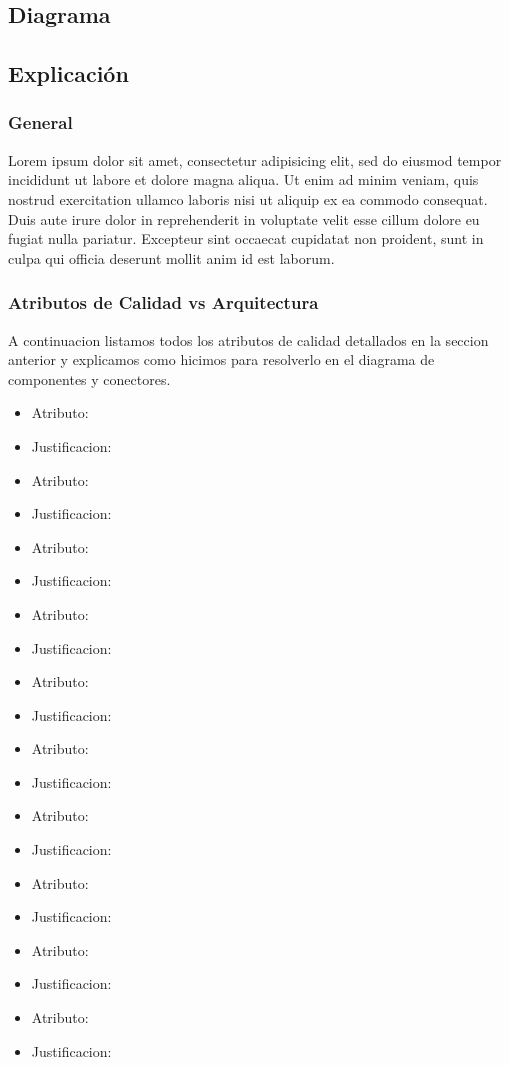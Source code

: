\subsection{Diagrama}
\subsection{Explicación}
\subsubsection{General}
Lorem ipsum dolor sit amet, consectetur adipisicing elit, sed do eiusmod
tempor incididunt ut labore et dolore magna aliqua. Ut enim ad minim veniam,
quis nostrud exercitation ullamco laboris nisi ut aliquip ex ea commodo
consequat. Duis aute irure dolor in reprehenderit in voluptate velit esse
cillum dolore eu fugiat nulla pariatur. Excepteur sint occaecat cupidatat non
proident, sunt in culpa qui officia deserunt mollit anim id est laborum.

\subsubsection{Atributos de Calidad vs Arquitectura}
A continuacion listamos todos los atributos de calidad detallados en la seccion anterior y explicamos como hicimos para resolverlo en el diagrama de componentes y conectores.

\begin{itemize}
\item Atributo: 
\item Justificacion:


\item Atributo: 
\item Justificacion:

\item Atributo: 
\item Justificacion:

\item Atributo: 
\item Justificacion:

\item Atributo: 
\item Justificacion:

\item Atributo: 
\item Justificacion:

\item Atributo: 
\item Justificacion:

\item Atributo: 
\item Justificacion:

\item Atributo: 
\item Justificacion:

\item Atributo: 
\item Justificacion:
\end{itemize}

